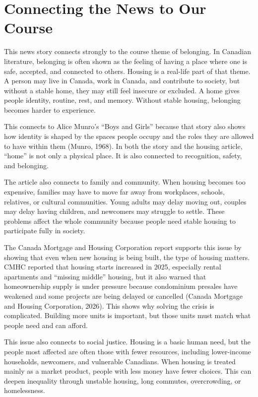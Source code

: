\documentclass[12pt]{article}
\begin{document}
\section*{Connecting the News to Our Course}

This news story connects strongly to the course theme of belonging. In Canadian literature, belonging is often shown as the feeling of having a place where one is safe, accepted, and connected to others. Housing is a real-life part of that theme. A person may live in Canada, work in Canada, and contribute to society, but without a stable home, they may still feel insecure or excluded. A home gives people identity, routine, rest, and memory. Without stable housing, belonging becomes harder to experience.

This connects to Alice Munro's ``Boys and Girls'' because that story also shows how identity is shaped by the spaces people occupy and the roles they are allowed to have within them (Munro, 1968). In both the story and the housing article, ``home'' is not only a physical place. It is also connected to recognition, safety, and belonging.

The article also connects to family and community. When housing becomes too expensive, families may have to move far away from workplaces, schools, relatives, or cultural communities. Young adults may delay moving out, couples may delay having children, and newcomers may struggle to settle. These problems affect the whole community because people need stable housing to participate fully in society.

The Canada Mortgage and Housing Corporation report supports this issue by showing that even when new housing is being built, the type of housing matters. CMHC reported that housing starts increased in 2025, especially rental apartments and ``missing middle'' housing, but it also warned that homeownership supply is under pressure because condominium presales have weakened and some projects are being delayed or cancelled (Canada Mortgage and Housing Corporation, 2026). This shows why solving the crisis is complicated. Building more units is important, but those units must match what people need and can afford.

This issue also connects to social justice. Housing is a basic human need, but the people most affected are often those with fewer resources, including lower-income households, newcomers, and vulnerable Canadians. When housing is treated mainly as a market product, people with less money have fewer choices. This can deepen inequality through unstable housing, long commutes, overcrowding, or homelessness.
\end{document}
